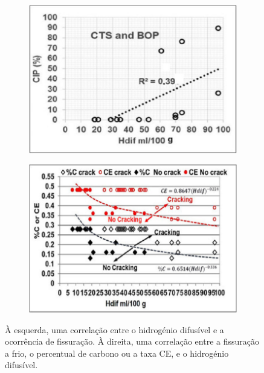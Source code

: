 \begin{figure}[htb]
    \centering
    \begin{subfigure}{.4\textwidth}
      \centering
      \includegraphics[width = 0.9\linewidth]{Figures/Cap2/Hdif_CE.png}
      \caption{}
      \label{fig:Hdif_CE}
    \end{subfigure}%
    \begin{subfigure}{.4\textwidth}
      \centering
      \includegraphics[width = 0.9\linewidth]{Figures/Cap2/CE_Hdif_Crack.png}
      \caption{}
      \label{fig:CE_Hdif_Crack}
    \end{subfigure}
    \caption[Correlações entre hidrogénio difusível e fissuração induzida por hidrogénio]%
    {À esquerda, uma correlação entre o hidrogénio difusível e a ocorrência de fissuração. À direita, uma correlação entre a fissuração a frio, o percentual de carbono ou a taxa CE, e o hidrogénio difusível.}
    \end{figure}
